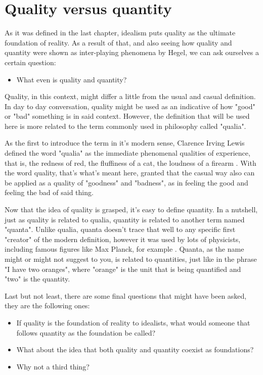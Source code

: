 \section{Quality versus quantity}
As it was defined in the last chapter, idealism puts quality as the ultimate foundation
of reality. As a result of that, and also seeing how quality and quantity were shown as
inter-playing phenomena by Hegel, we can ask ourselves a certain question:

\begin{itemize}
    \item What even is quality and quantity?
\end{itemize}

Quality, in this context, might differ a little from the usual and casual definition.
In day to day conversation, quality might be used as an indicative of how "good" or
"bad" something is in said context. However, the definition that will be used here is
more related to the term commonly used in philosophy called "qualia".

As the first to introduce the term in it's modern sense, Clarence Irving Lewis defined
the word "qualia" as the immediate phenomenal qualities of experience, that is, the
redness of red, the fluffiness of a cat, the loudness of a firearm \cite{Lewis1956}.
With the word quality, that's what's meant here, granted that the casual way also
can be applied as a quality of "goodness" and "badness", as in feeling the good and
feeling the bad of said thing.

Now that the idea of quality is grasped, it's easy to define quantity. In a nutshell,
just as quality is related to qualia, quantity is related to another term named "quanta".
Unlike qualia, quanta doesn't trace that well to any specific first "creator" of the
modern definition, however it was used by lots of physicists, including famous figures
like Max Planck, for example \cite{Planck1901}. Quanta, as the name might or might not
suggest to you, is related to quantities, just like in the phrase "I have two oranges",
where "orange" is the unit that is being quantified and "two" is the quantity.

Last but not least, there are some final questions that might have been asked, they are
the following ones:

\begin{itemize}
    \item If quality is the foundation of reality to idealists, what would someone that
    follows quantity as the foundation be called?
    \item What about the idea that both quality and quantity coexist as foundations?
    \item Why not a third thing?
\end{itemize}

